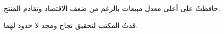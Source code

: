 \begin{achievements}
	\item حافظتُ على أعلى معدل مبيعات بالرغم من ضعف الاقتصاد وتقادم المنتج.
	\item قدتُ المكتب لتحقيق نجاح ومجد لا حدود لهما.
\end{achievements}
